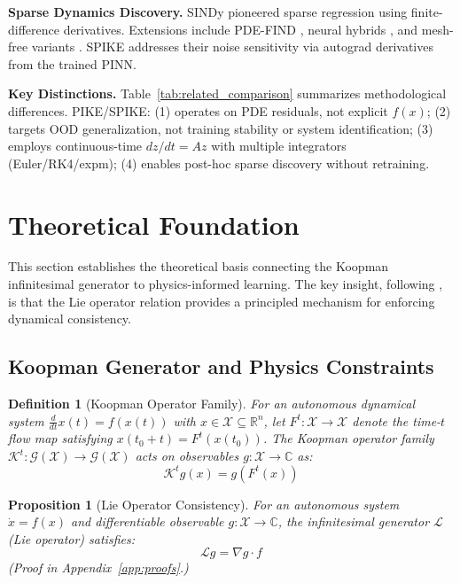 \documentclass{article}
\newtheorem{definition}{Definition}
\newtheorem{proposition}{Proposition}
\theoremstyle{remark}
\begin{document}
\textbf{Sparse Dynamics Discovery.} SINDy \citep{brunton2016sindy} pioneered sparse regression using finite-difference derivatives. Extensions include PDE-FIND \citep{rudy2017pdefind}, neural hybrids \citep{champion2019discovery}, and mesh-free variants \citep{meshfreesindy2025}. SPIKE addresses their noise sensitivity via autograd derivatives from the trained PINN.

\textbf{Key Distinctions.} Table~\ref{tab:related_comparison} summarizes methodological differences. PIKE/SPIKE: (1) operates on PDE residuals, not explicit $f(x)$; (2) targets OOD generalization, not training stability \citep{hanna2025variance} or system identification; (3) employs continuous-time $dz/dt = Az$ with multiple integrators (Euler/RK4/expm); (4) enables post-hoc sparse discovery without retraining.

\section{Theoretical Foundation}
\label{sec:theory}

This section establishes the theoretical basis connecting the Koopman infinitesimal generator to physics-informed learning. The key insight, following \citet{liu2022physicskoopman}, is that the Lie operator relation provides a principled mechanism for enforcing dynamical consistency.

\subsection{Koopman Generator and Physics Constraints}

\begin{definition}[Koopman Operator Family]
\label{def:koopman}
For an autonomous dynamical system $\frac{d}{dt}x(t) = f(x(t))$ with $x \in \mathcal{X} \subseteq \mathbb{R}^n$, let $F^t: \mathcal{X} \rightarrow \mathcal{X}$ denote the time-$t$ flow map satisfying $x(t_0 + t) = F^t(x(t_0))$. The Koopman operator family $\mathcal{K}^t: \mathcal{G}(\mathcal{X}) \rightarrow \mathcal{G}(\mathcal{X})$ acts on observables $g: \mathcal{X} \rightarrow \mathbb{C}$ as:
\begin{equation}
\mathcal{K}^t g(x) = g(F^t(x))
\end{equation}
\end{definition}

\begin{proposition}[Lie Operator Consistency]
\label{prop:lie}
For an autonomous system $\dot{x} = f(x)$ and differentiable observable $g: \mathcal{X} \rightarrow \mathbb{C}$, the infinitesimal generator $\mathcal{L}$ (Lie operator) satisfies:
\begin{equation}
\mathcal{L}g = \nabla g \cdot f
\label{eq:lie_fundamental}
\end{equation}
(Proof in Appendix~\ref{app:proofs}.)
\end{proposition}
\end{document}
